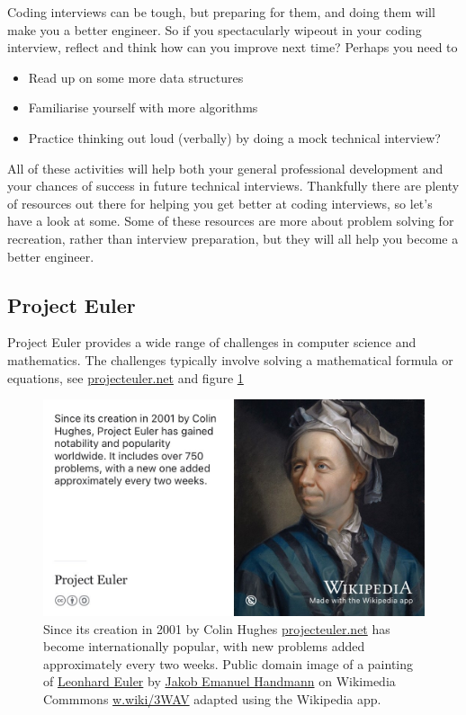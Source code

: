 \documentclass[
]{book}
\providecommand{\tightlist}{%
  \setlength{\itemsep}{0pt}\setlength{\parskip}{0pt}}
\begin{document}
Coding interviews can be tough, but preparing for them, and doing them will make you a better engineer. So if you spectacularly wipeout in your coding interview, reflect and think how can you improve next time? Perhaps you need to

\begin{itemize}
\tightlist
\item
  Read up on some more data structures
\item
  Familiarise yourself with more algorithms
\item
  Practice thinking out loud (verbally) by doing a mock technical interview?
\end{itemize}

All of these activities will help both your general professional development and your chances of success in future technical interviews. Thankfully there are plenty of resources out there for helping you get better at coding interviews, so let's have a look at some. Some of these resources are more about problem solving for recreation, rather than interview preparation, but they will all help you become a better engineer.

\hypertarget{euler}{%
\subsection{Project Euler}\label{euler}}

Project Euler provides a wide range of challenges in computer science and mathematics. The challenges typically involve solving a mathematical formula or equations, see \href{https://projecteuler.net/}{projecteuler.net} and figure \ref{fig:euler-fig}

\begin{figure}

{\centering \includegraphics[width=0.99\linewidth]{images/project-euler} 

}

\caption{Since its creation in 2001 by Colin Hughes \href{https://projecteuler.net/}{projecteuler.net} has become internationally popular, with new problems added approximately every two weeks. \citep{colinhughes} Public domain image of a painting of \href{https://en.wikipedia.org/wiki/Leonhard_Euler}{Leonhard Euler} by \href{https://en.wikipedia.org/wiki/Jakob_Emanuel_Handmann}{Jakob Emanuel Handmann} on Wikimedia Commmons \href{https://w.wiki/3WAV}{w.wiki/3WAV} adapted using the Wikipedia app.}\label{fig:euler-fig}
\end{figure}
\end{document}
